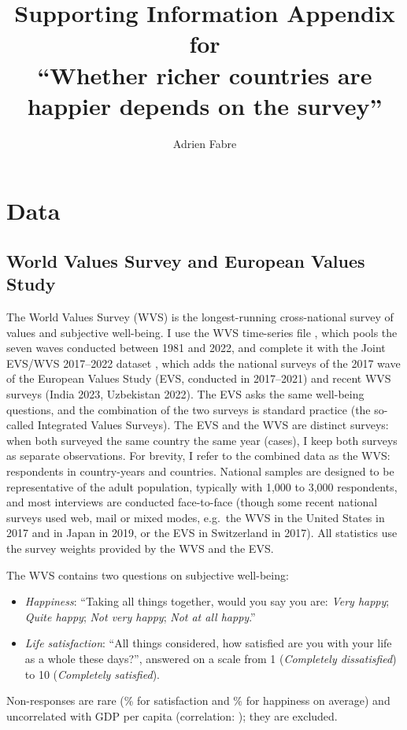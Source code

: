 \documentclass[11pt]{article}
\title{Supporting Information Appendix for\\ ``Whether richer countries are happier depends on the survey''}
\author{Adrien Fabre}
\date{}
\begin{document}
\maketitle
\tableofcontents
\clearpage

\section{Data}\label{sec:si_data}
\subsection{World Values Survey and European Values Study}\label{subsec:wvs}
The World Values Survey (WVS) is the longest-running cross-national survey of values and subjective well-being. I use the WVS time-series file \citep{wvs_trend_2022}, which pools the seven waves conducted between 1981 and 2022, and complete it with the Joint EVS/WVS 2017--2022 dataset \citep{evs_wvs_joint_2024}, which adds the \nEVSSurveys national surveys of the 2017 wave of the European Values Study (EVS, conducted in 2017--2021) and \nNewWVSSurveys recent WVS surveys (India 2023, Uzbekistan 2022). The EVS asks the same well-being questions, and the combination of the two surveys is standard practice (the so-called Integrated Values Surveys). The EVS and the WVS are distinct surveys: when both surveyed the same country the same year (\nEVSSameYearWVS cases), I keep both surveys as separate observations.
For brevity, I refer to the combined data as the WVS: \nWVSRespondents respondents in \nWVSCountryYears country-years and \nWVSCountries countries. National samples are designed to be representative of the adult population, typically with 1,000 to 3,000 respondents, and most interviews are conducted face-to-face (though some recent national surveys used web, mail or mixed modes, e.g.\ the WVS in the United States in 2017 and in Japan in 2019, or the EVS in Switzerland in 2017). All statistics use the survey weights provided by the WVS and the EVS.

The WVS contains two questions on subjective well-being:
\begin{itemize}
    \item \textit{Happiness}: ``Taking all things together, would you say you are: \textit{Very happy}; \textit{Quite happy}; \textit{Not very happy}; \textit{Not at all happy}.''
    \item \textit{Life satisfaction}: ``All things considered, how satisfied are you with your life as a whole these days?'', answered on a scale from 1 (\textit{Completely dissatisfied}) to 10 (\textit{Completely satisfied}).
\end{itemize}
Non-responses are rare (\nonresponseSatisfactionWVS\% for satisfaction and \nonresponseHappinessWVS\% for happiness on average) and uncorrelated with GDP per capita (correlation: \corNonresponseGDP); they are excluded.
\end{document}
